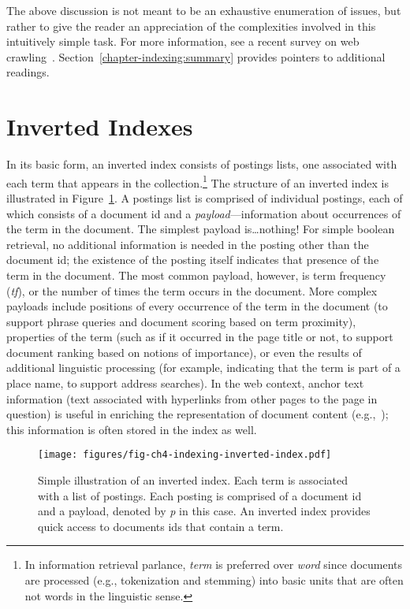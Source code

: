 \noindent The above discussion is not meant to be an exhaustive
enumeration of issues, but rather to give the reader an appreciation
of the complexities involved in this intuitively simple task.  For
more information, see a recent survey on web
crawling~\cite{Olston_Najork_2010}.
Section~\ref{chapter-indexing:summary} provides pointers to additional
readings.

\section{Inverted Indexes}
\label{chapter-indexing:intro}

In its basic form, an inverted index consists of postings lists, one
associated with each term that appears in the collection.\footnote{In
  information retrieval parlance, \emph{term} is preferred over \emph{
    word} since documents are processed (e.g., tokenization and
  stemming) into basic units that are often not words in the
  linguistic sense.} The structure of an inverted index is illustrated
in Figure~\ref{chapter-indexing:inverted-index}.  A postings list is
comprised of individual postings, each of which consists of a document
id and a \emph{payload}---information about occurrences of the term in
the document.  The simplest payload is\ldots nothing!  For simple
boolean retrieval, no additional information is needed in the posting
other than the document id; the existence of the posting itself
indicates that presence of the term in the document.  The most common
payload, however, is term frequency (\emph{tf}), or the number of times
the term occurs in the document.  More complex payloads include
positions of every occurrence of the term in the document (to support
phrase queries and document scoring based on term proximity),
properties of the term (such as if it occurred in the page title or
not, to support document ranking based on notions of importance), or
even the results of additional linguistic processing (for example,
indicating that the term is part of a place name, to support address
searches).  In the web context, anchor text information (text
associated with hyperlinks from other pages to the page in question)
is useful in enriching the representation of document content
(e.g.,~\cite{Metzler_etal_2009}); this information is often stored in
the index as well.

\begin{figure}[t]
\begin{center}
\texttt{[image: figures/fig-ch4-indexing-inverted-index.pdf]}
\end{center}
\caption{Simple illustration of an inverted index.  Each term is
  associated with a list of postings.  Each posting is comprised of a
  document id and a payload, denoted by \emph{p} in this case.  An
  inverted index provides quick access to documents ids that contain a
  term.}
\label{chapter-indexing:inverted-index}
\end{figure}

